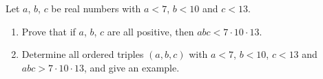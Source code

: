 Let $a$, $b$, $c$ be real numbers with $a<7$, $b<10$ and $c<13$.
\begin{enumerate}
\item[(a)] Prove that if $a$, $b$, $c$ are all positive, then $abc<7\cdot10\cdot13$.
\item[(b)] Determine all ordered triples $(a,b,c)$ with $a<7$, $b<10$, $c<13$ and $abc>7\cdot10\cdot13$, and give an example.
\end{enumerate}
